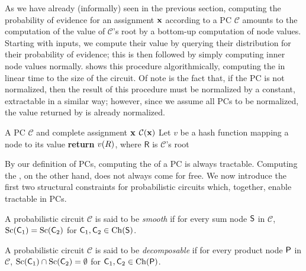 As we have already (informally) seen in the previous section, computing the probability of evidence
for an assignment $\mathbf{x}$ according to a PC $\mathcal{C}$ amounts to the computation of the value
of $\mathcal{C}$'s root by a bottom-up computation of node values. Starting with inputs, we compute
their value by querying their distribution for their probability of evidence; this is then
followed by simply computing inner node values normally.  shows this procedure
algorithmically, computing the \evi{} in linear time to the size of the circuit. Of note is the
fact that, if the PC is not normalized, then the result of this procedure must be normalized by a
constant, extractable in a similar way; however, since we assume all PCs to be normalized, the
value returned by  is already normalized.

\begin{algorithm}[t]
  \caption{\evi}\label{alg:evi}
  \begin{algorithmic}[1]
    \Require A PC $\mathcal{C}$ and complete assignment $\mathbf{x}$
    \Ensure $\mathcal{C}(\mathbf{x})$
    \State Let $v$ be a hash function mapping a node to its value
    \EndFor%
    \State \textbf{return} $v(\normalfont{R})$, where $\textsf{R}$ is $\mathcal{C}$'s root
  \end{algorithmic}
\end{algorithm}

By our definition of PCs, computing the \evi{} of a PC is always tractable. Computing the \mar{},
on the other hand, does not always come for free. We now introduce the first two structural
constraints for probabilistic circuits which, together, enable tractable \mar{} in PCs.

\begin{definition}[Smoothness]
  A probabilistic circuit $\mathcal{C}$ is said to be \emph{smooth} if for every sum node $\operatorname{\textup{\textsf{S}}}$ in
  $\mathcal{C}$, $\operatorname*{\normalfont{Sc}}(\operatorname{\textup{\textsf{C}}}_1)=\operatorname*{\normalfont{Sc}}(\operatorname{\textup{\textsf{C}}}_2)$ for $\operatorname{\textup{\textsf{C}}}_1,\operatorname{\textup{\textsf{C}}}_2\in\operatorname*{\normalfont{Ch}}(\operatorname{\textup{\textsf{S}}})$.
\end{definition}

\begin{definition}[Decomposability]
  A probabilistic circuit $\mathcal{C}$ is said to be \emph{decomposable} if for every product node
  $\operatorname{\textup{\textsf{P}}}$ in $\mathcal{C}$, $\operatorname*{\normalfont{Sc}}(\operatorname{\textup{\textsf{C}}}_1)\cap\operatorname*{\normalfont{Sc}}(\operatorname{\textup{\textsf{C}}}_2)=\emptyset$ for $\operatorname{\textup{\textsf{C}}}_1,\operatorname{\textup{\textsf{C}}}_2\in
  \operatorname*{\normalfont{Ch}}(\operatorname{\textup{\textsf{P}}})$.
\end{definition}

